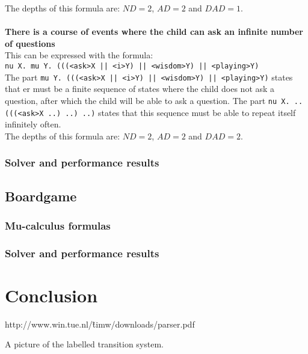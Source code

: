 \documentclass[10pt,a4paper]{article}
\begin{document}
The depths of this formula are: $ND = 2$, $AD = 2$ and $DAD = 1$.
\\\\
\textbf{There is a course of events where the child can ask an infinite number of questions}\\
This can be expressed with the formula:\\
{\tt nu X. mu Y. (((<ask>X || <i>Y) || <wisdom>Y) || <playing>Y)}\\
The part {\tt mu Y. (((<ask>X || <i>Y) || <wisdom>Y) || <playing>Y)} states that er must be a finite sequence of states where the child does not ask a question, after which the child will be able to ask a question. The part {\tt nu X. .. (((<ask>X ..) ..) ..)} states that this sequence must be able to repeat itself infinitely often.\\
The depths of this formula are: $ND = 2$, $AD = 2$ and $DAD = 2$.

\subsubsection{Solver and performance results}



\subsection{Boardgame}

\subsubsection{Mu-calculus formulas}

\subsubsection{Solver and performance results}


\section{Conclusion}\label{conc}


\begin{thebibliography}{9}

 http://www.win.tue.nl/\~timw/downloads/parser.pdf

\end{thebibliography}

A picture of the labelled transition system.
\end{document}
